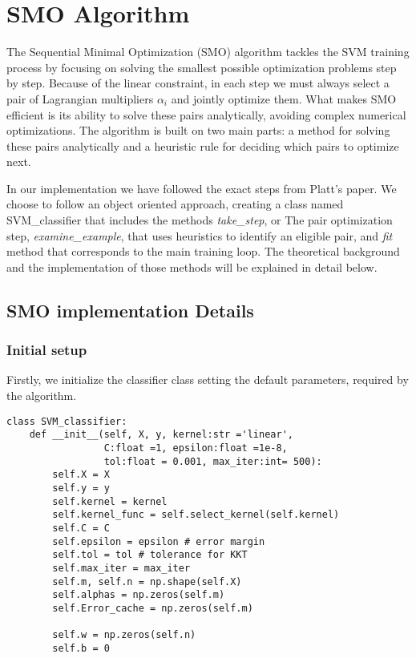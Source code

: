 \documentclass[10pt,a4paper]{article}
\newcounter{para}
\begin{document}
\section{SMO Algorithm}
\label{sec:smo}

The Sequential Minimal Optimization (SMO) algorithm tackles the SVM training process by focusing on solving the smallest possible optimization problems step by step. Because of the linear constraint, in each step we must always select a pair of Lagrangian multipliers \(\alpha_i\) and jointly optimize them. What makes SMO efficient is its ability to solve these pairs analytically, avoiding complex numerical optimizations. 
The algorithm is built on two main parts: a method for solving these pairs analytically and a heuristic rule for deciding which pairs to optimize next. 

In our implementation we have followed the exact steps from Platt's paper. We choose to follow an object oriented approach, creating a class named SVM\_classifier that includes the methods \textit{take\_step}, or The pair optimization step, \textit{examine\_example}, that uses heuristics to identify an eligible pair, and \textit{fit} method that corresponds to the main training loop. The theoretical background and the implementation of those methods will be explained in detail below.

\subsection{SMO implementation Details}

\subsubsection{Initial setup}
Firstly, we initialize the classifier class setting the default parameters, required by the algorithm.

\begin{lstlisting}
class SVM_classifier:
	def __init__(self, X, y, kernel:str ='linear', 
				 C:float =1, epsilon:float =1e-8,
				 tol:float = 0.001, max_iter:int= 500):
		self.X = X
		self.y = y
		self.kernel = kernel
		self.kernel_func = self.select_kernel(self.kernel)
		self.C = C
		self.epsilon = epsilon # error margin 
		self.tol = tol # tolerance for KKT
		self.max_iter = max_iter
		self.m, self.n = np.shape(self.X) 
		self.alphas = np.zeros(self.m)
		self.Error_cache = np.zeros(self.m)

		self.w = np.zeros(self.n)
		self.b = 0
\end{lstlisting}
\end{document}
